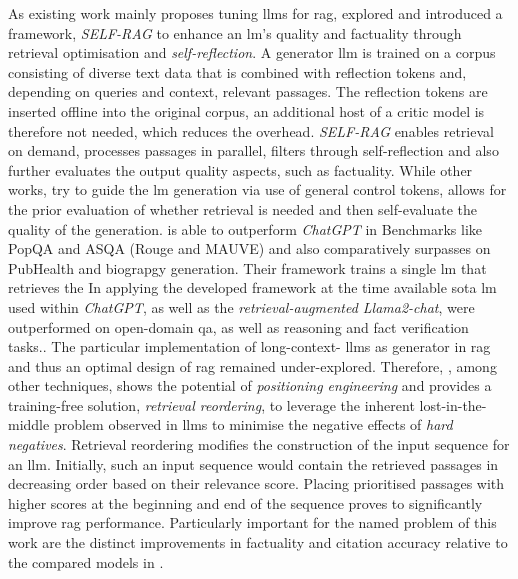 %
As existing work mainly proposes tuning \ac{llm}s for \ac{rag}, \citet{Asai2023SelfRAGLT} explored and introduced a framework, \textit{SELF-RAG} to enhance an \ac{lm}'s quality and factuality through retrieval optimisation and \textit{self-reflection}.
A generator \ac{llm} is trained on a corpus consisting of diverse text data that is combined with reflection tokens and, depending on queries and context, relevant passages. 
The reflection tokens are inserted offline into the original corpus, an additional host of a critic model is therefore not needed, which reduces the overhead.
\textit{SELF-RAG} enables retrieval on demand, processes passages in parallel, filters through self-reflection and also further evaluates the output quality aspects, such as factuality.
While other works, \citet{lu2022QuarkCT, Korbak2023PretrainingLM} try to guide the \ac{lm} generation via use of general control tokens, \citet{Asai2023SelfRAGLT}  allows for the prior evaluation of whether retrieval is needed and then self-evaluate the quality of the generation.
\citet{Asai2023SelfRAGLT} is able to outperform \textit{ChatGPT} in Benchmarks like PopQA and ASQA (Rouge and MAUVE) and also comparatively surpasses on PubHealth and biograpgy generation.
Their framework trains a single \ac{lm} that retrieves the 
In applying the developed framework at the time available \ac{sota} \ac{lm} used within \textit{ChatGPT}, as well as the \textit{retrieval-augmented Llama2-chat}, were outperformed on open-domain \ac{qa}, as well as reasoning and fact verification tasks.\citep{jin2024longcontextllmsmeetrag}.
%
The particular implementation of long-context- \ac{llm}s as generator in \ac{rag} and thus an optimal design of \ac{rag} remained under-explored.\citep{jin2024longcontextllmsmeetrag}
%
Therefore, \citet{jin2024longcontextllmsmeetrag}, among other techniques, shows the potential of \textit{positioning engineering} and provides a training-free solution, \textit{retrieval reordering}, to leverage the inherent lost-in-the-middle problem observed in \ac{llm}s to minimise the negative effects of \textit{hard negatives}.
Retrieval reordering modifies the construction of the input sequence for an \ac{llm}.
Initially, such an input sequence would contain the retrieved passages in decreasing order based on their relevance score.
Placing prioritised passages with higher scores at the beginning and end of the sequence proves to significantly improve \ac{rag} performance.\citep{jin2024longcontextllmsmeetrag}
%
Particularly important for the named problem of this work are the distinct improvements in factuality and citation accuracy relative to the compared models in \citet{jin2024longcontextllmsmeetrag}.
